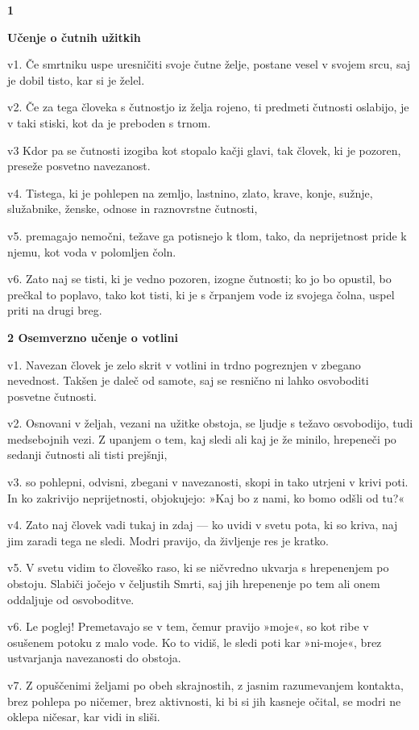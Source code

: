 \textbf{1 }

\textbf{Učenje o čutnih užitkih }

v1. Če smrtniku uspe uresničiti svoje čutne želje, postane vesel v svojem srcu, saj je dobil tisto, kar si je želel.

v2. Če za tega človeka s čutnostjo iz želja rojeno, ti predmeti čutnosti oslabijo, je v taki stiski, kot da je preboden s trnom.

v3 Kdor pa se čutnosti izogiba kot stopalo kačji glavi, tak človek, ki je pozoren, preseže posvetno navezanost.

v4. Tistega, ki je pohlepen na zemljo, lastnino, zlato, krave, konje, sužnje, služabnike, ženske, odnose in raznovrstne čutnosti,

v5. premagajo nemočni, težave ga potisnejo k tlom, tako, da neprijetnost pride k njemu, kot voda v polomljen čoln.

v6. Zato naj se tisti, ki je vedno pozoren, izogne čutnosti; ko jo bo opustil, bo prečkal to poplavo, tako kot tisti, ki je s črpanjem vode iz svojega čolna, uspel priti na drugi breg.

\textbf{2 Osemverzno učenje o votlini }

v1. Navezan človek je zelo skrit v votlini in trdno pogreznjen v zbegano nevednost. Takšen je daleč od samote, saj se resnično ni lahko osvoboditi posvetne čutnosti.

v2. Osnovani v željah, vezani na užitke obstoja, se ljudje s težavo osvobodijo, tudi medsebojnih vezi. Z upanjem o tem, kaj sledi ali kaj je že minilo, hrepeneči po sedanji čutnosti ali tisti prejšnji,

v3. so pohlepni, odvisni, zbegani v navezanosti, skopi in tako utrjeni v krivi poti. In ko zakrivijo neprijetnosti, objokujejo: »Kaj bo z nami, ko bomo odšli od tu?«

v4. Zato naj človek vadi tukaj in zdaj --- ko uvidi v svetu pota, ki so kriva, naj jim zaradi tega ne sledi. Modri pravijo, da življenje res je kratko.

v5. V svetu vidim to človeško raso, ki se ničvredno ukvarja s hrepenenjem po obstoju. Slabiči jočejo v čeljustih Smrti, saj jih hrepenenje po tem ali onem oddaljuje od osvoboditve.

v6. Le poglej! Premetavajo se v tem, čemur pravijo »moje«, so kot ribe v osušenem potoku z malo vode. Ko to vidiš, le sledi poti kar »ni-moje«, brez ustvarjanja navezanosti do obstoja.

v7. Z opuščenimi željami po obeh skrajnostih, z jasnim razumevanjem kontakta, brez pohlepa po ničemer, brez aktivnosti, ki bi si jih kasneje očital, se modri ne oklepa ničesar, kar vidi in sliši.

